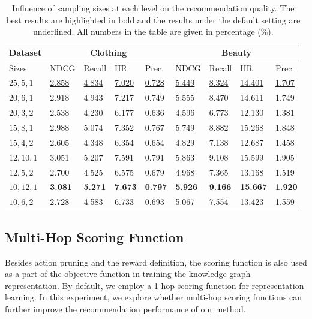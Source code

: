 \documentclass[sigconf]{acmart}
\begin{document}
\begin{table}[t]
	\centering
	\small
	\begin{tabular}{p{3em}|p{2.em}p{}p{}p{}|p{2.em}p{}p{}p{}}
		\hline
		Dataset & \multicolumn{4}{c|}{\textbf{Clothing}} & \multicolumn{4}{c}{\textbf{Beauty}} \\
		\hline
		Sizes & NDCG & Recall & HR & Prec. & NDCG & Recall & HR & Prec. \\
		\hline
		$25, 5, 1$  & \underline{2.858} & \underline{4.834} & \underline{7.020} & \underline{0.728} & \underline{5.449} & \underline{8.324} & \underline{14.401} & \underline{1.707} \\
		$20, 6, 1$  & 2.918 & 4.943 & 7.217 & 0.749 & 5.555 & 8.470 & 14.611 & 1.749 \\
		$20, 3, 2$  & 2.538 & 4.230 & 6.177 & 0.636 & 4.596 & 6.773 & 12.130 & 1.381 \\
		$15, 8, 1$  & 2.988 & 5.074 & 7.352 & 0.767 & 5.749	& 8.882 & 15.268 & 1.848 \\
		$15, 4, 2$  & 2.605 & 4.348 & 6.354 & 0.654 & 4.829 & 7.138 & 12.687 & 1.458 \\
		$12, 10, 1$ & 3.051 & 5.207 & 7.591 & 0.791 & 5.863 & 9.108 & 15.599 & 1.905 \\
		$12, 5, 2$  & 2.700 & 4.525 & 6.575 & 0.679 & 4.968 & 7.365 & 13.168 & 1.519 \\
		$10, 12, 1$ & \textbf{3.081} & \textbf{5.271} & \textbf{7.673} & \textbf{0.797} & \textbf{5.926} & \textbf{9.166} & \textbf{15.667} & \textbf{1.920} \\
		$10, 6, 2$  & 2.728 & 4.583 & 6.733 & 0.693 & 5.067 & 7.554 & 13.423 & 1.559 \\
		\hline
	\end{tabular}
	\caption{Influence of sampling sizes at each level on the recommendation quality. The best results are highlighted in bold and the results under the default setting are underlined. All numbers in the table are given in percentage (\%).}
	\label{tab:sample_size}
	\vspace{-23pt}
\end{table}

\subsection{Multi-Hop Scoring Function}
Besides action pruning and the reward definition, the scoring function is also used as a part of the objective function in training the knowledge graph representation.
By default, we employ a 1-hop scoring function for representation learning.
In this experiment, we explore whether multi-hop scoring functions can further improve the recommendation performance of our method.
\end{document}
